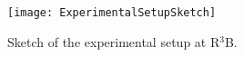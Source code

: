 



	


\begin{newpdflayout}{210mm}{297mm}%
	
	\begin{figure}
		\texttt{[image: ExperimentalSetupSketch]}
		\caption{Sketch of the experimental setup at R$^3$B.}
		\label{fig:ExperimentalSetupSketch}
	\end{figure}
	
\end{newpdflayout}















